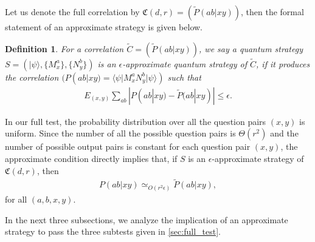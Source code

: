 \documentclass[11pt,letterpaper]{article}
\newcommand{\ket}[1]{|#1\rangle}
\newcommand{\bra}[1]{\langle#1|}
\newcommand{\1}{\mathbb{1}}
\newcommand{\fC}{\mathfrak{C}}
\newcommand{\pr}[2]{P(#1|#2)}
\newcommand{\tpr}[2]{\tilde{P}(#1|#2)}
\newcommand{\ep}{\epsilon}
\newcommand{\appd}[1]{\simeq_{#1}}
\newtheorem{definition}[theorem]{Definition}
\theoremstyle{definition}
\begin{document}
Let us denote the full correlation by $\fC(d,r) = ( \tpr{ab}{xy} )$, then the formal statement of an approximate strategy is given below.
\begin{definition}
	For a correlation $\tilde{C} = (\tpr{ab}{xy})$,
	we say a quantum strategy $S = (\ket{\psi}, \{M_x^a\}, \{N_y^b\})$
	is an $\ep$-approximate quantum strategy of $\tilde{C}$, 
	if it produces the correlation
	$( \pr{ab}{xy} = \bra{\psi} M_x^a N_y^b \ket{\psi} )$ such that
	\begin{align}
	E_{(x,y)} \sum_{ab} |\pr{ab}{xy} - \tpr{ab}{xy}| \leq \ep.
	\end{align}
\end{definition}
In our full test, the probability distribution over all the question pairs $(x,y)$ is uniform.
Since the number of all the possible question pairs is $\Theta(r^2)$ and 
the number of possible output pairs is constant for each question pair $(x,y)$, 
the approximate condition directly implies that, if $S$ is an $\ep$-approximate strategy
of $\fC(d,r)$, then
\begin{align*}
    \pr{ab}{xy} \appd{O(r^2\ep)} \tpr{ab}{xy},
\end{align*}
for all $(a,b,x,y)$.

In the next three subsections, we analyze the implication of an approximate strategy to pass the 
three subtests given in \cref{sec:full_test}.

\end{document}
